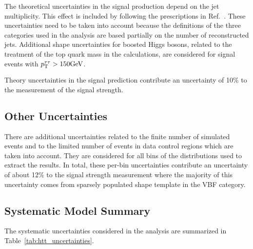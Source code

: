 The theoretical uncertainties in the signal production depend on the jet multiplicity. This effect is included 
by following the prescriptions in Ref.~\cite{Stewart:2011cf}. These uncertainties need to be taken into account because 
the definitions of the three categories used in the analysis are based partially on the number of reconstructed 
jets. Additional shape uncertainties for boosted Higgs bosons, related to the treatment of the top quark mass in 
the calculations, are considered for signal events with $p_\mathrm{T}^{\tau\tau}>150\mathrm{GeV}$.

Theory uncertainties in the signal prediction contribute an uncertainty of 10\% to the measurement of the signal strength.


\subsection{Other Uncertainties}
There are additional uncertainties related to the finite number of simulated events and to the limited number 
of events in data control regions which are taken into account. They are considered for all bins of the 
distributions used to extract the results. In total, these per-bin uncertainties contribute an uncertainty of 
about 12\% to the signal strength measurement where the majority of this uncertainty comes from sparsely populated 
shape template in the VBF category.


\subsection{Systematic Model Summary}
The systematic uncertainties considered in the analysis are summarized in Table~\ref{tab:htt_uncertainties}.

